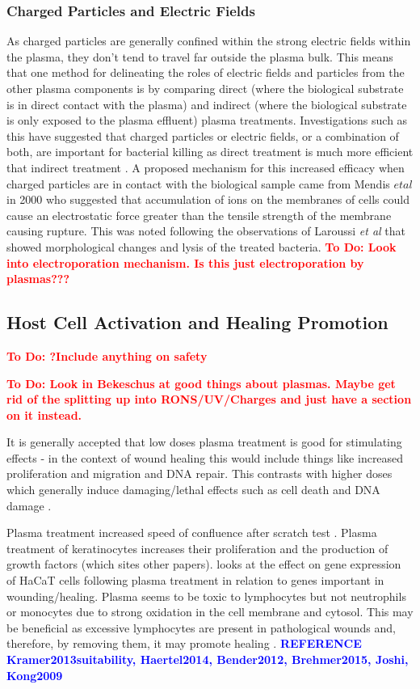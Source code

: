 \documentclass[11pt, oneside]{article}   	%
\newcommand{\todo}[1]{ \textcolor{red}{\bf{To Do:} #1}}
\newcommand{\toref}[1]{ \textcolor{blue}{\bf{REFERENCE #1}}}
\begin{document}
\subsubsection{Charged Particles and Electric Fields}
As charged particles are generally confined within the strong electric fields within the plasma, they don't tend to travel far outside the plasma bulk.
This means that one method for delineating the roles of electric fields and particles from the other plasma components is by comparing direct (where the biological substrate is in direct contact with the plasma) and indirect (where the biological substrate is only exposed to the plasma effluent) plasma treatments.
Investigations such as this have suggested that charged particles or electric fields, or a combination of both, are important for bacterial killing as direct treatment is much more efficient that indirect treatment \cite{Fridman2007comparison}.
A proposed mechanism for this increased efficacy when charged particles are in contact with the biological sample came from Mendis $et al$ in 2000 \cite{Mendis2000a} who suggested that accumulation of ions on the membranes of cells could cause an electrostatic force greater than the tensile strength of the membrane causing rupture.
This was noted following the observations of Laroussi \textit{et al} \cite{Laroussi1999images} that showed morphological changes and lysis of the treated bacteria.
\todo{Look into electroporation mechanism. Is this just electroporation by plasmas???}

\subsection{Host Cell Activation and Healing Promotion}
\todo{?Include anything on safety}


\todo{Look in Bekeschus at good things about plasmas. Maybe get rid of the splitting up into RONS/UV/Charges and just have a section on it instead.}

It is generally accepted that low doses plasma treatment is good for stimulating effects - in the context of wound healing this would include things like increased proliferation and migration and DNA repair. 
This contrasts with higher doses which generally induce damaging/lethal effects such as cell death and DNA damage \cite{Haertel2014nonthermal}. 

Plasma treatment increased speed of confluence after scratch test \cite{Tipa2011plasma}.
Plasma treatment of keratinocytes increases their proliferation and the production of growth factors \cite{Bekeschus2016the} (which sites other papers).
\cite{Barton2013nonthermal} looks at the effect on gene expression of HaCaT cells following plasma treatment in relation to genes important in wounding/healing.
Plasma seems to be toxic to lymphocytes but not neutrophils or monocytes due to strong oxidation in the cell membrane and cytosol. This may be beneficial as excessive lymphocytes are present in pathological wounds and, therefore, by removing them, it may promote healing \cite{Bekeschus2016the}.
\toref{Kramer2013suitability, Haertel2014, Bender2012, Brehmer2015, Joshi, Kong2009}
\end{document}
